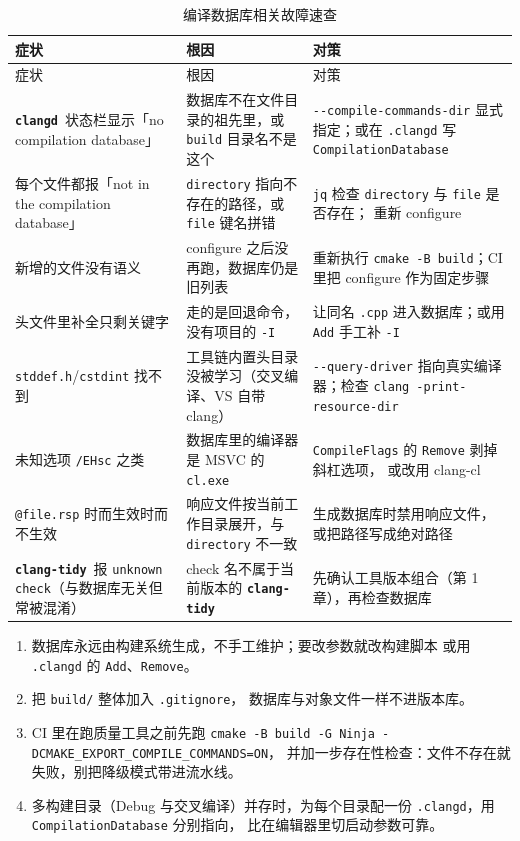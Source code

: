 \documentclass[12pt,a4paper,fontset=fandol]{ctexbook}
\newcommand{\Opt}[1]{\texttt{-\/-#1}}
\newcommand{\Bk}{\discretionary{}{}{}}
\newcommand{\Lib}[1]{\textbf{\texttt{#1}}}
\newcommand{\Tidy}{\Lib{clang-tidy}}
\newcommand{\CD}{\Lib{clangd}}
\begin{document}
\begin{longtable}{@{}>{\raggedright\arraybackslash\small}p{}
                 >{\raggedright\arraybackslash\small}p{}
                 >{\raggedright\arraybackslash\small}p{}@{}}
\caption{编译数据库相关故障速查}\label{tab:ch02-debug} \\
\toprule
症状 & 根因 & 对策 \\
\midrule
\endfirsthead
\toprule
症状 & 根因 & 对策 \\
\midrule
\endhead
\CD\ 状态栏显示「no compilation database」 &
  数据库不在文件目录的祖先里，或 \texttt{build} 目录名不是这个 &
  \Opt{compile-commands-dir} 显式指定；或在 \texttt{.clangd}
  写 \texttt{Compilation\allowbreak Database} \\
每个文件都报「not in the compilation database」 &
  \texttt{directory} 指向不存在的路径，或 \texttt{file} 键名拼错 &
  \texttt{jq} 检查 \texttt{directory} 与 \texttt{file} 是否存在；
  重新 configure \\
新增的文件没有语义 &
  configure 之后没再跑，数据库仍是旧列表 &
  重新执行 \texttt{cmake -B build}；CI 里把 configure 作为固定步骤 \\
头文件里补全只剩关键字 &
  走的是回退命令，没有项目的 \texttt{-I} &
  让同名 \texttt{.cpp} 进入数据库；或用 \texttt{Add} 手工补 \texttt{-I} \\
\texttt{stddef.h}/{\Bk}\texttt{cstdint} 找不到 &
  工具链内置头目录没被学习（交叉编译、VS 自带 clang） &
  \Opt{query-driver} 指向真实编译器；检查
  \texttt{clang -print-resource-dir} \\
未知选项 \texttt{/EHsc} 之类 &
  数据库里的编译器是 MSVC 的 \texttt{cl.exe} &
  \texttt{CompileFlags} 的 \texttt{Remove} 剥掉斜杠选项，
  或改用 clang-cl \\
\texttt{@file.rsp} 时而生效时而不生效 &
  响应文件按当前工作目录展开，与 \texttt{directory} 不一致 &
  生成数据库时禁用响应文件，或把路径写成绝对路径 \\
\Tidy\ 报 \texttt{unknown check}（与数据库无关但常被混淆） &
  check 名不属于当前版本的 \Tidy &
  先确认工具版本组合（第 1 章），再检查数据库 \\
\bottomrule
\end{longtable}

\begin{bestpractice}[title={把数据库当成构建产物对待}]
\begin{enumerate}
  \item 数据库永远由构建系统生成，不手工维护；要改参数就改构建脚本
        或用 \texttt{.clangd} 的 \texttt{Add}、\texttt{Remove}。
  \item 把 \texttt{build/} 整体加入 \texttt{.gitignore}，
        数据库与对象文件一样不进版本库。
  \item CI 里在跑质量工具之前先跑
        \texttt{cmake -B build -G Ninja -DCMAKE\_{\Bk}EXPORT\_{\Bk}COMPILE\_{\Bk}COMMANDS=ON}，
        并加一步存在性检查：文件不存在就失败，别把降级模式带进流水线。
  \item 多构建目录（Debug 与交叉编译）并存时，为每个目录配一份
        \texttt{.clangd}，用 \texttt{CompilationDatabase} 分别指向，
        比在编辑器里切启动参数可靠。
\end{enumerate}
\end{bestpractice}
\end{document}
